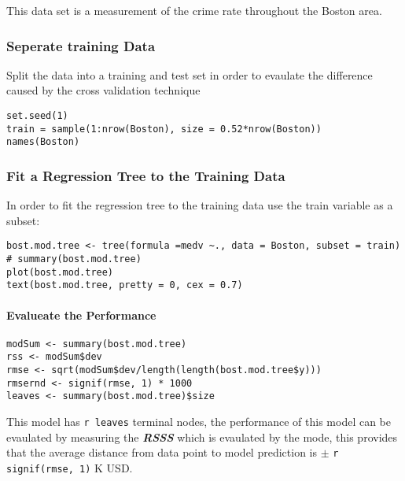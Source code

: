 \documentclass[12pt]{article}
\newcommand{\passthrough}[1]{#1}
\begin{document}
This data set is a measurement of the crime rate throughout the Boston
area.

\hypertarget{seperate-training-data}{%
\subsubsection{Seperate training Data}\label{seperate-training-data}}

Split the data into a training and test set in order to evaulate the
difference caused by the cross validation technique

\begin{lstlisting}
set.seed(1)
train = sample(1:nrow(Boston), size = 0.52*nrow(Boston))
names(Boston)
\end{lstlisting}

\hypertarget{fit-a-regression-tree-to-the-training-data}{%
\subsubsection{Fit a Regression Tree to the Training
Data}\label{fit-a-regression-tree-to-the-training-data}}

In order to fit the regression tree to the training data use the train
variable as a subset:

\begin{lstlisting}
bost.mod.tree <- tree(formula =medv ~., data = Boston, subset = train)
# summary(bost.mod.tree)
plot(bost.mod.tree)
text(bost.mod.tree, pretty = 0, cex = 0.7)

\end{lstlisting}

\hypertarget{evalueate-the-performance}{%
\paragraph{Evalueate the Performance}\label{evalueate-the-performance}}

\begin{lstlisting}
modSum <- summary(bost.mod.tree)
rss <- modSum$dev
rmse <- sqrt(modSum$dev/length(length(bost.mod.tree$y)))
rmsernd <- signif(rmse, 1) * 1000
leaves <- summary(bost.mod.tree)$size
\end{lstlisting}

This model has \passthrough{\lstinline!r leaves!} terminal nodes, the
performance of this model can be evaulated by measuring the
\textbf{\emph{RSSS}} which is evaulated by the mode, this provides that
the average distance from data point to model prediction is \(\pm\)
\passthrough{\lstinline!r signif(rmse, 1)!} K USD.
\end{document}
